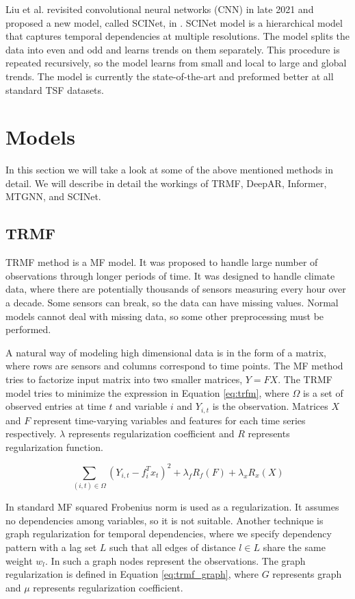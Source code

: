 \documentclass[conference]{IEEEtran}
\begin{document}
Liu et al. revisited convolutional neural networks (CNN) in late 2021 and proposed a new model, called SCINet, in \cite{liu2021scinet}.
SCINet model is a hierarchical model that captures temporal dependencies at multiple resolutions.
The model splits the data into even and odd and learns trends on them separately.
This procedure is repeated recursively, so the model learns from small and local to large and global trends.
The model is currently the state-of-the-art and preformed better at all standard TSF datasets.

\section{Models}
\label{chap:models}

In this section we will take a look at some of the above mentioned methods in detail. We will describe in detail the workings of TRMF, DeepAR, Informer, MTGNN, and SCINet.

\subsection{\textbf{TRMF}}

TRMF method is a MF model.
It was proposed to handle large number of observations through longer periods of time.
It was designed to handle climate data, where there are potentially thousands of sensors measuring every hour over a decade.
Some sensors can break, so the data can have missing values.
Normal models cannot deal with missing data, so some other preprocessing must be performed.

A natural way of modeling high dimensional data is in the form of a matrix, where rows are sensors and columns correspond to time points.
The MF method tries to factorize input matrix into two smaller matrices, $Y = FX$.
The TRMF model tries to minimize the expression in Equation \ref{eq:trfm}, where $\Omega$ is a set of observed entries at time $t$ and variable $i$ and $Y_{i,t}$ is the observation.
Matrices $X$ and $F$ represent time-varying variables and features for each time series respectively.
$\lambda$ represents regularization coefficient and $R$ represents regularization function.

\begin{equation}
\label{eq:trfm}
    \sum_{(i, t) \in \Omega} (Y_{i,t}-f_{i}^{T}x_{t})^{2}+\lambda_{f}R_{f}(F)+\lambda_{x}R_{x}(X)
\end{equation}

In standard MF squared Frobenius norm is used as a regularization.
It assumes no dependencies among variables, so it is not suitable.
Another technique is graph regularization for temporal dependencies, where we specify dependency pattern with a lag set $L$ such that all edges of distance $l \in L$ share the same weight $w_{l}$.
In such a graph nodes represent the observations.
The graph regularization is defined in Equation \ref{eq:trmf_graph}, where $G$ represents graph and $\mu$ represents regularization coefficient.
\end{document}
